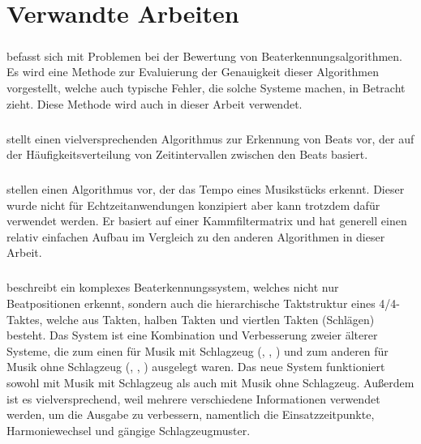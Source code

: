 \chapter{Verwandte Arbeiten}
\label{verwandte_arbeiten}

\paragraph{\cite{1997_GoMu1}}
{
	befasst sich mit Problemen bei der Bewertung von Beaterkennungsalgorithmen.
	Es wird eine Methode zur Evaluierung der Genauigkeit dieser Algorithmen vorgestellt,
		welche auch typische Fehler,
		die solche Systeme machen,
		in Betracht zieht.
	Diese Methode wird auch in dieser Arbeit verwendet.
}


\paragraph{\cite{2000_Di}}
{
	stellt einen vielversprechenden Algorithmus zur Erkennung von Beats vor,
		der auf der Häufigkeitsverteilung von Zeitintervallen zwischen den Beats basiert.
}

\paragraph{\cite{2001_BeatThis}}
{
	stellen einen Algorithmus vor,
		der das Tempo eines Musikstücks erkennt.
	Dieser wurde nicht für Echtzeitanwendungen konzipiert
		aber kann trotzdem dafür verwendet werden.
	Er basiert auf einer Kammfiltermatrix
		und hat generell einen relativ einfachen Aufbau im Vergleich zu den anderen Algorithmen in dieser Arbeit.
}

\paragraph{\cite{2001_Go}}
{
	beschreibt ein komplexes Beaterkennungssystem,
		welches nicht nur Beatpositionen erkennt,
		sondern auch die hierarchische Taktstruktur eines 4/4-Taktes,
		welche aus Takten, halben Takten und viertlen Takten (Schlägen) besteht.
	Das System ist eine Kombination und Verbesserung zweier älterer Systeme,
		die zum einen für Musik mit Schlagzeug (\cite{1994_GoMu}, \cite{1995_GoMu1}, \cite{1998_GoMu})
		und zum anderen für Musik ohne Schlagzeug (\cite{1996_GoMu}, \cite{1997_GoMu2}, \cite{1999_GoMu})
		ausgelegt waren.
	Das neue System funktioniert sowohl mit Musik mit Schlagzeug als auch mit Musik ohne Schlagzeug.
	Au{\ss}erdem ist es vielversprechend,
		weil mehrere verschiedene Informationen verwendet werden,
		um die Ausgabe zu verbessern,
		namentlich die Einsatzzeitpunkte, Harmoniewechsel und gängige Schlagzeugmuster.
}

